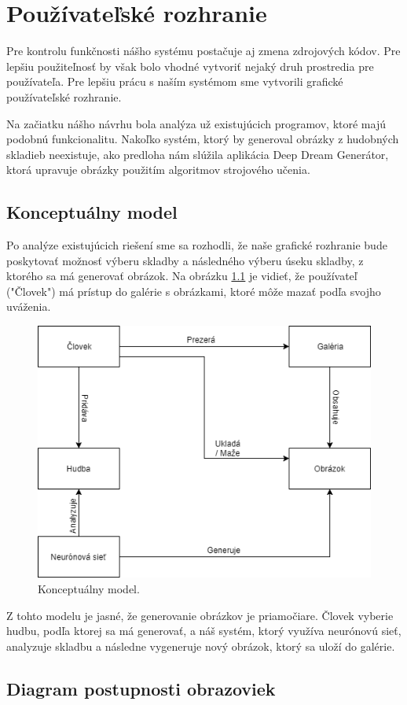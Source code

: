 \chapter{Používateľské rozhranie}
\label{pouzivatelske_rozhranie}

Pre kontrolu funkčnosti nášho systému postačuje aj zmena zdrojových kódov.
Pre lepšiu použiteľnosť by však bolo vhodné vytvoriť nejaký druh prostredia pre používateľa.
Pre lepšiu prácu s naším systémom sme vytvorili grafické používateľské rozhranie.

Na začiatku nášho návrhu bola analýza už existujúcich programov, ktoré majú podobnú funkcionalitu.
Nakoľko systém, ktorý by generoval obrázky z hudobných skladieb neexistuje, ako predloha nám slúžila aplikácia Deep Dream Generátor, ktorá upravuje obrázky použitím algoritmov strojového učenia.

\section{Konceptuálny model}
Po analýze existujúcich riešení sme sa rozhodli, že naše grafické rozhranie bude poskytovať možnosť výberu skladby a následného výberu úseku skladby, z ktorého sa má generovať obrázok.
Na obrázku \ref{kon_model} je vidieť, že používateľ ("Človek") má prístup do galérie s obrázkami, ktoré môže mazať podľa svojho uváženia.
\begin{figure}[!ht]
	\centering 
	\includegraphics[height=.5\textwidth]{figures/km} 
	\caption{Konceptuálny model.} 
	\label{kon_model}
\end{figure}
Z tohto modelu je jasné, že generovanie obrázkov je priamočiare.
Človek vyberie hudbu, podľa ktorej sa má generovať, a náš systém, ktorý využíva neurónovú sieť, analyzuje skladbu a následne vygeneruje nový obrázok, ktorý sa uloží do galérie.

\section{Diagram postupnosti obrazoviek}

